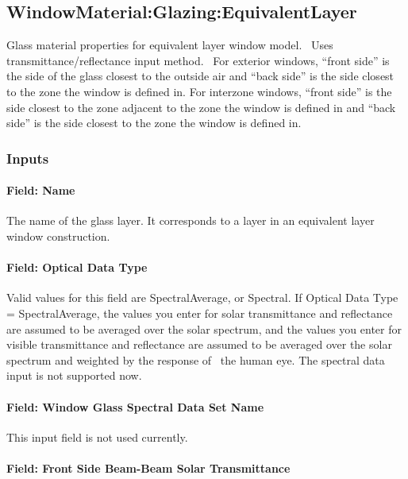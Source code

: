 \subsection{WindowMaterial:Glazing:EquivalentLayer}\label{windowmaterialglazingequivalentlayer}

Glass material properties for equivalent layer window model.~ Uses transmittance/reflectance input method.~ For exterior windows, ``front side'' is the side of the glass closest to the outside air and ``back side'' is the side closest to the zone the window is defined in. For interzone windows, ``front side'' is the side closest to the zone adjacent to the zone the window is defined in and ``back side'' is the side closest to the zone the window is defined in.

\subsubsection{Inputs}\label{inputs-30-001}

\paragraph{Field: Name}\label{field-name-24-002}

The name of the glass layer. It corresponds to a layer in an equivalent layer window construction.

\paragraph{Field: Optical Data Type}\label{field-optical-data-type-1}

Valid values for this field are SpectralAverage, or Spectral. If Optical Data Type = SpectralAverage, the values you enter for solar transmittance and reflectance are assumed to be averaged over the solar spectrum, and the values you enter for visible transmittance and reflectance are assumed to be averaged over the solar spectrum and weighted by the response of~ the human eye. The spectral data input is not supported now.

\paragraph{Field: Window Glass Spectral Data Set Name}\label{field-window-glass-spectral-data-set-name-0}

This input field is not used currently.

\paragraph{Field: Front Side Beam-Beam Solar Transmittance}\label{field-front-side-beam-beam-solar-transmittance}

